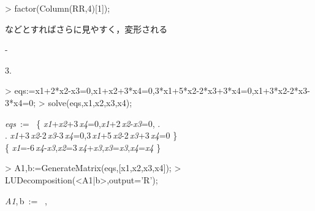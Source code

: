 \begin{enumerate}
\begin{MapleInput}
> factor(Column(RR,4)[1]);
\end{MapleInput}
などとすればさらに見やすく，変形される
\begin{MapleOutput}
-{}
\end{MapleOutput}
3.
\begin{MapleInput}
> eqs:={x1+2*x2-x3=0,x1+x2+3*x4=0,3*x1+5*x2-2*x3+3*x4=0,x1+3*x2-2*x3-3*x4=0};
> solve(eqs,{x1,x2,x3,x4}); 
\end{MapleInput}
\begin{MapleOutputGather}
{\it eqs}\, := \, \left\{ {\it x1}+{\it x2}+3\,{\it x4}=0,{\it x1}+2\,{\it x2}-{\it x3}=0, \right. \notag \\
\left. {\it x1}+3\,{\it x2}-2\,{\it x3}-3\,{\it x4}=0,3\,{\it x1}+5\,{\it x2}-2\,{\it x3}+3\,{\it x4}=0 \right\} \notag \\
\left\{ {\it x1}=-6\,{\it x4}-{\it x3},{\it x2}=3\,{\it x4}+{\it x3},{\it x3}={\it x3},{\it x4}={\it x4} \right\} \notag
\end{MapleOutputGather}

\begin{MapleInput}
> A1,b:=GenerateMatrix(eqs,[x1,x2,x3,x4]);
> LUDecomposition(<A1|b>,output='R');
\end{MapleInput}
\begin{MapleOutputGather}
{\it A1},\,b\, := \,  ,\, \left[ \begin {array}{c} 0\\  0\\  0\\  0\end {array} \right]   \notag \\
   \notag
\end{MapleOutputGather}
\end{enumerate}